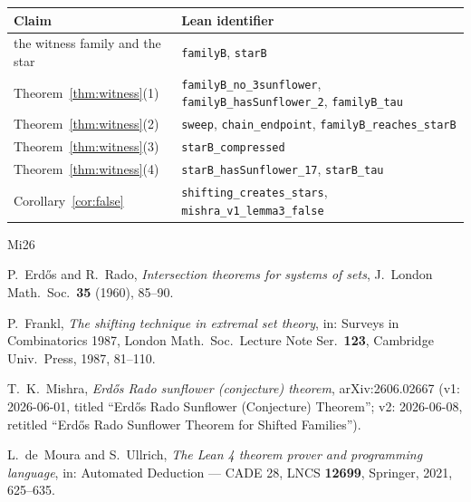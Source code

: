 \documentclass[11pt,a4paper]{article}
\theoremstyle{remark}
\begin{document}
\begin{center}
\begin{tabular}{ll}
\hline
Claim & Lean identifier \\
\hline
the witness family and the star &
  \texttt{familyB}, \texttt{starB} \\
Theorem~\ref{thm:witness}(1) &
  \texttt{familyB\_no\_3sunflower}, \texttt{familyB\_hasSunflower\_2},
  \texttt{familyB\_tau} \\
Theorem~\ref{thm:witness}(2) &
  \texttt{sweep}, \texttt{chain\_endpoint},
  \texttt{familyB\_reaches\_starB} \\
Theorem~\ref{thm:witness}(3) &
  \texttt{starB\_compressed} \\
Theorem~\ref{thm:witness}(4) &
  \texttt{starB\_hasSunflower\_17}, \texttt{starB\_tau} \\
Corollary~\ref{cor:false} &
  \texttt{shifting\_creates\_stars}, \texttt{mishra\_v1\_lemma3\_false} \\
\hline
\end{tabular}
\end{center}

\begin{thebibliography}{Mi26}

P.~Erd\H{o}s and R.~Rado,
\emph{Intersection theorems for systems of sets},
J.\ London Math.\ Soc.\ \textbf{35} (1960), 85--90.

P.~Frankl,
\emph{The shifting technique in extremal set theory},
in: Surveys in Combinatorics 1987, London Math.\ Soc.\ Lecture Note
Ser.\ \textbf{123}, Cambridge Univ.\ Press, 1987, 81--110.

T.~K.~Mishra,
\emph{Erd\H{o}s Rado sunflower (conjecture) theorem},
arXiv:2606.02667 (v1: 2026-06-01, titled ``Erd\H{o}s Rado Sunflower
(Conjecture) Theorem''; v2: 2026-06-08, retitled ``Erd\H{o}s Rado
Sunflower Theorem for Shifted Families'').

L.~de~Moura and S.~Ullrich,
\emph{The Lean 4 theorem prover and programming language},
in: Automated Deduction --- CADE 28, LNCS \textbf{12699}, Springer,
2021, 625--635.

\end{thebibliography}
\end{document}
